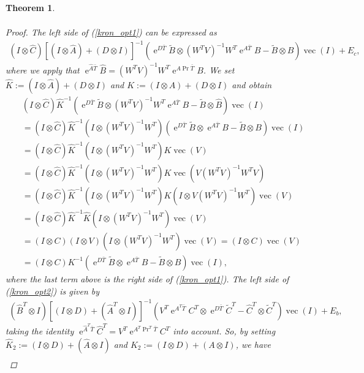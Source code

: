 \documentclass[a4paper,11pt, twoside]{article}
\newcommand{\expn}{\operatorname{e}}
\newcommand{\pro}{\operatorname{Pr}}
\newcommand{\vect}{\operatorname{vec}}
\newtheorem{thm}[defn]{Theorem}
\begin{document}
\begin{thm}
\begin{align*}
                               \end{align*}
\begin{proof}
The left side of (\ref{kron_opt1}) can be expressed as \begin{align*}
  (I\otimes \hat C)  \left[(I\otimes \hat A)+(D\otimes I)\right]^{-1}(\expn^{D \bar T}\tilde B \otimes (W^TV)^{-1}W^T\expn^{A \bar T} B 
-\tilde B \otimes \hat B) \vect(I)+ E_c,
                                                       \end{align*}
where we apply that $\expn^{\hat A \bar T}\hat B=(W^TV)^{-1}W^T \expn^{A \pro \bar T} B$. We set $\hat K:= (I\otimes \hat A)+(D\otimes I)$ and $K:= 
(I\otimes A)+(D\otimes I)$ and obtain \begin{align*}
  &(I\otimes \hat C)  \hat K^{-1}(\expn^{D \bar T}\tilde B \otimes (W^TV)^{-1}W^T\expn^{A \bar T} B 
-\tilde B \otimes \hat B) \vect(I)\\&= (I\otimes \hat C)  \hat K^{-1} (I\otimes (W^TV)^{-1}W^T) (\expn^{D \bar T}\tilde B \otimes \expn^{A \bar T} B 
-\tilde B \otimes B) \vect(I)\\&= (I\otimes \hat C)  \hat K^{-1} (I\otimes (W^TV)^{-1}W^T) K \vect(V)\\&=(I\otimes \hat C)  \hat K^{-1} (I\otimes 
(W^TV)^{-1}W^T) K \vect(V(W^TV)^{-1}W^T V)\\&=(I\otimes \hat C)  \hat K^{-1} (I\otimes 
(W^TV)^{-1}W^T) K (I\otimes V(W^TV)^{-1}W^T) \vect(V)\\&=(I\otimes \hat C)  \hat K^{-1}  \hat K (I\otimes (W^TV)^{-1}W^T) \vect(V)\\&=(I\otimes C) 
(I\otimes V) (I\otimes (W^TV)^{-1}W^T) \vect(V)=(I\otimes C)\vect(V)\\&= (I\otimes C) K^{-1} (\expn^{D \bar T}\tilde B 
\otimes \expn^{A \bar T} B -\tilde B \otimes B) \vect(I),
                                                       \end{align*}
where the last term above is the right side of (\ref{kron_opt1}). The left side of (\ref{kron_opt2}) is given by \begin{align*}
(\hat B^T\otimes I) \left[(I\otimes D)+(\hat A^T\otimes I)\right]^{-1}(V^T\expn^{A^T \bar T} C^T \otimes \expn^{D \bar T}\tilde C^T-\hat C^T 
\otimes \tilde C^T)\vect(I)+E_b, \end{align*}
taking the identity $\expn^{\hat A^T \bar T}\hat C^T=V^T\expn^{ A^T \pro^T \bar T} C^T$ into account. So, by setting $\hat K_2:= (I\otimes D)+(\hat 
A\otimes I)$ and $K_2:= (I\otimes D)+(A\otimes I)$, we have \begin{equation}\label{proof:Eb}\begin{aligned}

\end{aligned}
\end{equation}
\end{proof}
\end{thm}
\end{document}
